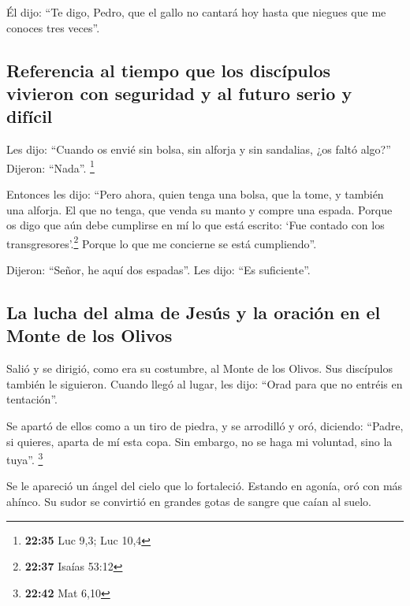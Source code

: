  Él dijo: ``Te digo, Pedro, que el gallo no cantará hoy
hasta que niegues que me conoces tres veces''.

\hypertarget{referencia-al-tiempo-que-los-discuxedpulos-vivieron-con-seguridad-y-al-futuro-serio-y-difuxedcil}{%
\subsection{Referencia al tiempo que los discípulos vivieron con
seguridad y al futuro serio y
difícil}\label{referencia-al-tiempo-que-los-discuxedpulos-vivieron-con-seguridad-y-al-futuro-serio-y-difuxedcil}}

 Les dijo: ``Cuando os envié sin bolsa, sin alforja y sin
sandalias, ¿os faltó algo?'' Dijeron: ``Nada''. \footnote{\textbf{22:35}
  Luc 9,3; Luc 10,4}

 Entonces les dijo: ``Pero ahora, quien tenga una bolsa,
que la tome, y también una alforja. El que no tenga, que venda su manto
y compre una espada.  Porque os digo que aún debe
cumplirse en mí lo que está escrito: `Fue contado con los
transgresores'.\footnote{\textbf{22:37} Isaías 53:12} Porque lo que me
concierne se está cumpliendo''.

 Dijeron: ``Señor, he aquí dos espadas''. Les dijo: ``Es
suficiente''.

\hypertarget{la-lucha-del-alma-de-jesuxfas-y-la-oraciuxf3n-en-el-monte-de-los-olivos}{%
\subsection{La lucha del alma de Jesús y la oración en el Monte de los
Olivos}\label{la-lucha-del-alma-de-jesuxfas-y-la-oraciuxf3n-en-el-monte-de-los-olivos}}

 Salió y se dirigió, como era su costumbre, al Monte de
los Olivos. Sus discípulos también le siguieron.  Cuando
llegó al lugar, les dijo: ``Orad para que no entréis en tentación''.

 Se apartó de ellos como a un tiro de piedra, y se
arrodilló y oró,  diciendo: ``Padre, si quieres, aparta
de mí esta copa. Sin embargo, no se haga mi voluntad, sino la tuya''.
\footnote{\textbf{22:42} Mat 6,10}

 Se le apareció un ángel del cielo que lo fortaleció.
 Estando en agonía, oró con más ahínco. Su sudor se
convirtió en grandes gotas de sangre que caían al suelo.

